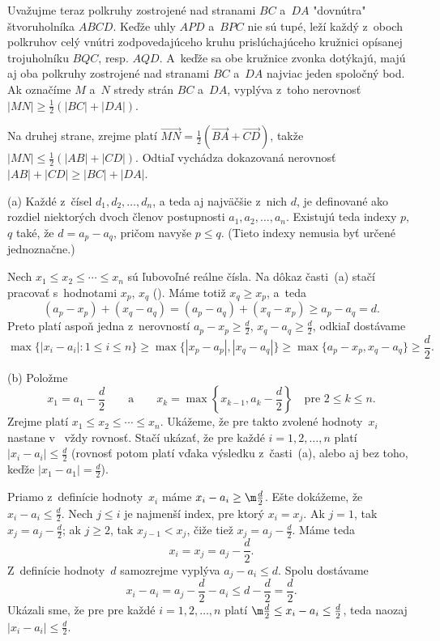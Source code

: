 {Uvažujme teraz polkruhy zostrojené nad stranami $BC$ a~$DA$
"dovnútra" štvoruholníka $ABCD$. Keďže uhly $APD$ a~$BPC$ nie sú
tupé, leží každý z~oboch polkruhov celý vnútri zodpovedajúceho
kruhu prislúchajúceho kružnici opísanej trojuholníku $BQC$, resp. $AQD$. A~keďže sa obe
kružnice zvonka dotýkajú, majú aj oba polkruhy zostrojené nad
stranami $BC$ a~$DA$ najviac jeden spoločný bod. Ak označíme $M$ a~$N$ stredy strán $BC$ a~$DA$, vyplýva
z~toho nerovnosť $|MN|\ge \frac12(|BC|+|DA|)$.

Na druhej strane, zrejme platí $\overrightarrow{MN}=\frac12(\overrightarrow{BA}+\overrightarrow{CD})$,
takže $|MN|\le \frac12(|AB|+|CD|)$. Odtiaľ vychádza dokazovaná
nerovnosť $|AB|+|CD|\ge |BC|+|DA|$.
}

{%
(a) Každé z~čísel $d_1,d_2,\dots,d_n$, a teda aj najväčšie z~nich $d$, je definované ako rozdiel niektorých dvoch členov postupnosti $a_1,a_2,\dots,a_n$. Existujú teda indexy $p$, $q$ také, že $d=a_p-a_q$, pričom navyše $p\le q$. (Tieto indexy nemusia byť určené jednoznačne.)
%

Nech $x_1\le x_2\le\cdots\le x_n$ sú ľubovoľné reálne čísla. Na dôkaz časti~(a) stačí pracovať s~hodnotami $x_p$, $x_q$ (\obr).
Máme totiž $x_q\ge x_p$, a~teda
$$
  (a_p-x_p)+(x_q-a_q) = (a_p-a_q)+(x_q-x_p) \ge a_p-a_q=d.
$$
Preto platí aspoň jedna z~nerovností $a_p-x_p\ge\frac d2$, $x_q-a_q\ge\frac d2$, odkiaľ dostávame
$$
\max\{|x_i-a_i| : 1\le i\le n\} \ge \max\{|x_p-a_p|,|x_q-a_q|\} \ge \max\{a_p-x_p,x_q-a_q\} \ge \frac d2.
$$

\smallskip
(b) Položme
$$
x_1=a_1-\frac d2 \qquad\text{a}\qquad x_k=\max\left\{x_{k-1},a_k-\frac d2\right\}\quad\text{pre $2\le k\le n$.}
$$
Zrejme platí $x_1\le x_2\le\cdots\le x_n$. Ukážeme, že pre takto zvolené hodnoty~$x_i$ nastane v~\thetag{$*$} vždy rovnosť. Stačí ukázať, že pre každé $i=1,2,\dots,n$ platí $|x_i-a_i|\le \frac d2$ (rovnosť potom platí vďaka výsledku z~časti~(a), alebo aj bez toho, keďže $|x_1-a_1|=\frac d2$).

Priamo z~definície hodnoty~$x_i$ máme $x_i-a_i\ge\m\frac d2$. Ešte dokážeme, že $x_i-a_i\le\frac d2$. Nech $j\le i$ je najmenší index, pre ktorý $x_i=x_j$. Ak $j=1$, tak $x_j=a_j-\frac d2$; ak $j\ge2$, tak $x_{j-1}<x_j$, čiže tiež $x_j=a_j-\frac d2$. Máme teda 
$$
x_i=x_j=a_j-\frac d2.
$$
Z~definície hodnoty~$d$ samozrejme vyplýva $a_j-a_i\le d$. Spolu dostávame
$$
x_i-a_i=a_j-\frac d2-a_i\le d-\frac d2=\frac d2.
$$
Ukázali sme, že pre pre každé $i=1,2,\dots,n$ platí $\m\frac d2\le x_i-a_i\le\frac d2$, teda naozaj $|x_i-a_i|\le \frac d2$.
}

